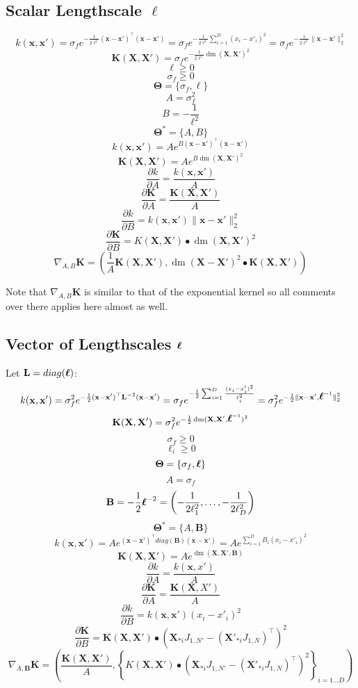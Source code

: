 \documentclass[a4paper,11pt]{article}
\newcommand\x{{\mathbf x}}
\newcommand\X{{\mathbf X}}
\newcommand\K{{\mathbf K}}
\newcommand\LL{{\mathbf L}}
\newcommand\ELL{{\Ivec \ell}}
\DeclareMathOperator*{\dm}{dm}
\newcommand{\Ivec}[1]{\mbox{\boldmath $#1$}}
\begin{document}
\subsection{Scalar Lengthscale $\ell$}
$$k(\x,\x') = \sigma_f e^{-\frac{1}{2\ell^2} (\x-\x')^{\top}(\x-\x')}
  = \sigma_f e^{-\frac{1}{2\ell^2} \sum_{i=1}^D (x_i - x'_i)^2} =
  \sigma_f e^{-\frac{1}{2\ell^2} \|\x-\x'\|_2^2}$$ 
$$\K(\X,\X') = \sigma_f e^{-\frac{1}{2\ell^2} \dm(\X,\X')^2}$$
$$\ell \ge 0$$
$$\sigma_f \ge 0$$
$$\mathbf{\Theta} = \{ \sigma_f, \ell \}$$
$$A = \sigma_f^2$$
$$B = -\frac{1}{\ell^2}$$
$$\mathbf{\Theta}^* = \{ A, B\}$$
$$k(\x,\x') = A e^{B (\x-\x')^{\top}(\x-\x')}$$
$$\K(\X,\X') = A e^{B \dm(\X,\X')^2}$$
$$\frac{\partial k}{\partial A} = \frac{k(\x,\x')}{A}$$
$$\frac{\partial \K}{\partial A} = \frac{\K(\X,\X')}{A}$$
$$\frac{\partial k}{\partial B} = k(\x,\x') \|\x-\x'\|_2^2$$
$$\frac{\partial \K}{\partial B} = K(\X,\X') \bullet \dm(\X,\X')^2$$
$$\nabla_{A,B} \K = (\frac{1}{A} \K(\X,\X'), \dm(\X-\X')^2 \bullet
\K(\X,\X'))$$

Note that $\nabla_{A,B} \K$ is similar to that of the exponential
kernel so all comments over there applies here almost as well.


\subsection{Vector of Lengthscales $\ELL$}
Let $\mathbf{L} = diag(\ELL)$:
$$k(\x,\x') = \sigma_f^2 e^{-\frac{1}{2}(\x-\x')^{\top} \LL^{-2}
  (\x-\x')} = \sigma_f e^{-\frac{1}{2}\sum_{i=1}^D \frac{(x_i -
    x'_i)^2}{\ell_i^2}} = \sigma_f^2
e^{-\frac{1}{2}\|\x-\x',\ELL^{-1}\|_2^2}$$
$$\K(\X,\X') = \sigma_f^2 e^{-\frac{1}{2} \dm(\X,\X',\ELL^{-1})^2}$$
$$\sigma_f \ge 0$$
$$\ell_i \ge 0$$
$$\mathbf{\Theta} = \{ \sigma_f, \ELL\}$$
$$A = \sigma_f$$
$$\mathbf{B} = -\frac{1}{2}\ELL^{-2} =
\left(-\frac{1}{2\ell_1^2},\ldots,-\frac{1}{2\ell_D^2} \right)$$
$$\mathbf{\Theta}^* = \{ A, \mathbf{B}\}$$
$$k(\x,\x') = A e^{(\x-\x')^{\top} diag(\mathbf{B}) (\x-\x')} = A
e^{\sum_{i=1}^D B_i (x_i - x'_i)^2}$$ 
$$\K(\X,\X') = A e^{\dm(\X,\X',\mathbf{B})}$$
$$\frac{\partial k}{\partial A} = \frac{k(\x,x')}{A}$$
$$\frac{\partial \K}{\partial A} = \frac{\K(\X,X')}{A}$$
$$\frac{\partial k}{\partial B} = k(\x,\x') (x_i -x'_i)^2$$
$$\frac{\partial \K}{\partial B} = \K(\X,\X') \bullet
(\X_{*i}J_{1,N'}- (\X'_{*i}J_{1,N})^{\top})^2$$
$$\nabla_{A,\mathbf{B}} \K = \left(\frac{\K(\X,\X')}{A}, \left\{ K(\X,\X')
  \bullet (\X_{*i}J_{1,N'}- (\X'_{*i}J_{1,N})^{\top})^2 \right\}_{i=1
  \ldots D} \right)$$
\end{document}
